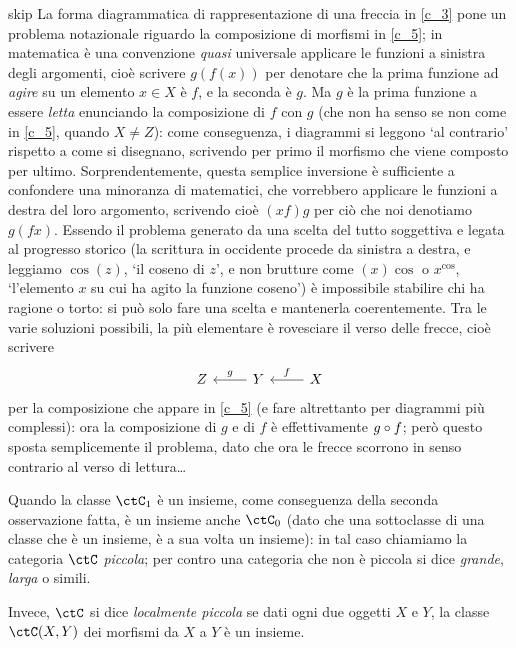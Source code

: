 \begin{hRemark}{skip}\label{sulla_compo}
	La forma diagrammatica di rappresentazione di una freccia in \ref{c_3} pone un problema notazionale riguardo la composizione di morfismi in \ref{c_5}; in matematica è una convenzione \emph{quasi} universale applicare le funzioni a sinistra degli argomenti, cioè scrivere \(g(f(x))\) per denotare che la prima funzione ad \emph{agire} su un elemento \(x\in X\) è \(f\), e la seconda è \(g\). Ma \(g\) è la prima funzione a essere \emph{letta} enunciando la composizione di \(f\) con \(g\) (che non ha senso se non come in \ref{c_5}, quando \(X\ne Z\)): come conseguenza, i diagrammi si leggono `al contrario' rispetto a come si disegnano, scrivendo per primo il morfismo che viene composto per ultimo.  Sorprendentemente, questa semplice inversione è sufficiente a confondere una minoranza di matematici, che vorrebbero applicare le funzioni a destra del loro argomento, scrivendo cioè \((xf)g\) per ciò che noi denotiamo \(g(fx)\). Essendo il problema generato da una scelta del tutto soggettiva e legata al progresso storico (la scrittura in occidente procede da sinistra a destra, e leggiamo \(\cos(z)\), `il coseno di \(z\)', e non brutture come \((x)\!\cos\) o \(x^{\cos}\), `l'elemento \(x\) su cui ha agito la funzione coseno') è impossibile stabilire chi ha ragione o torto: si può solo fare una scelta e mantenerla coerentemente. Tra le varie soluzioni possibili, la più elementare è rovesciare il verso delle frecce, cioè scrivere
	\[
		\begin{tikzcd}
			Z
			& Y \ar[l, "g"'] & X \ar[l, "f"']
		\end{tikzcd}
	\]
	per la composizione che appare in \ref{c_5} (e fare altrettanto per diagrammi più complessi): ora la composizione di \(g\) e di \(f\) è effettivamente \(g\circ f\); però questo sposta semplicemente il problema, dato che ora le frecce scorrono in senso contrario al verso di lettura\dots
\end{hRemark}
\begin{definition}
	Quando la classe \(\ctC_1\) è un insieme, come conseguenza della seconda osservazione fatta, è un insieme anche \(\ctC_0\) (dato che una sottoclasse di una classe che è un insieme, è a sua volta un insieme): in tal caso chiamiamo la categoria \(\ctC\) \emph{piccola}; per contro	una categoria che non è piccola si dice \emph{grande}, \emph{larga} o simili.

	Invece, \(\ctC\) si dice \emph{localmente piccola} se dati ogni due oggetti \(X\) e \(Y\), la classe \(\Hom{\ctC}(X,Y)\) dei morfismi da \(X\) a \(Y\) è un insieme.
\end{definition}

